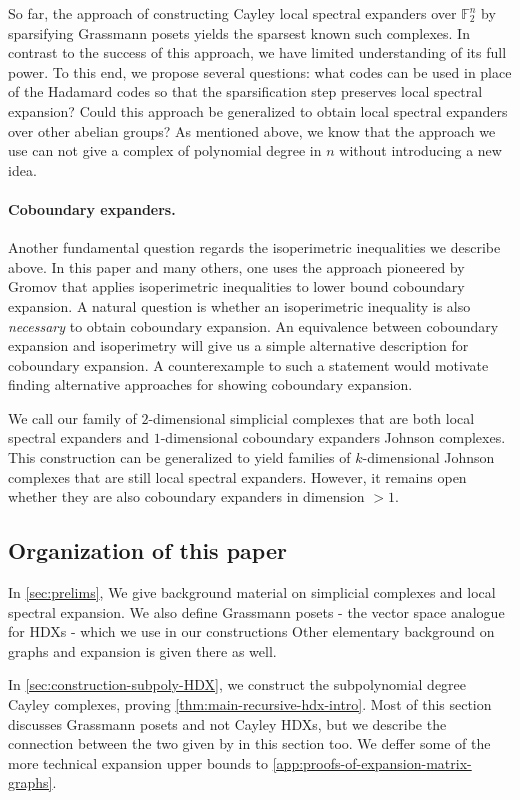 \documentclass[10pt,a4paper]{article}
\newcommand{\prettyref}[1]{\cref{#1}}
\theoremstyle{definition}
\theoremstyle{remark}
\newcommand{\F}{\mathbb{F}}
\numberwithin{equation}{section}
\let\origparagraph\paragraph
\renewcommand{\paragraph}[1]{\origparagraph{#1.}}
\let\pref=\prettyref
\begin{document}
So far, the approach of constructing Cayley local spectral expanders over $\F_2^n$ by sparsifying Grassmann posets yields the sparsest known such complexes. In contrast to the success of this approach, we have limited understanding of its full power. To this end, we propose several questions: what codes can be used in place of the Hadamard codes so that the sparsification step preserves local spectral expansion?  Could this approach be generalized to obtain local spectral expanders over other abelian groups? As mentioned above, we know that the approach we use can not give a complex of polynomial degree in \(n\) without introducing a new idea.

\paragraph{Coboundary expanders}Another fundamental question regards the isoperimetric inequalities we describe above. In this paper and many others, one uses the approach pioneered by Gromov \cite{Gromov2010} that applies isoperimetric inequalities to lower bound coboundary expansion. A natural question is whether an isoperimetric inequality is also \emph{necessary} to obtain coboundary expansion. An equivalence between coboundary expansion and isoperimetry will give us a simple alternative description for coboundary expansion. A counterexample to such a statement would motivate finding alternative approaches for showing coboundary expansion.

We call our family of $2$-dimensional simplicial complexes that are both local spectral expanders and $1$-dimensional coboundary expanders Johnson complexes. This construction can be generalized to yield families of $k$-dimensional Johnson complexes that are still local spectral expanders. However, it remains open whether they are also coboundary expanders in dimension $>1$.

\subsection{Organization of this paper}
In \pref{sec:prelims}, We give background material on simplicial complexes and local spectral expansion. We also define Grassmann posets - the vector space analogue for HDXs - which we use in our constructions Other elementary background on graphs and expansion is given there as well.

In \pref{sec:construction-subpoly-HDX}, we construct the subpolynomial degree Cayley complexes, proving \pref{thm:main-recursive-hdx-intro}. Most of this section discusses Grassmann posets and not Cayley HDXs, but we describe the connection between the two given by \cite{Golowich2023} in this section too. We deffer some of the more technical expansion upper bounds to \pref{app:proofs-of-expansion-matrix-graphs}.
\end{document}
